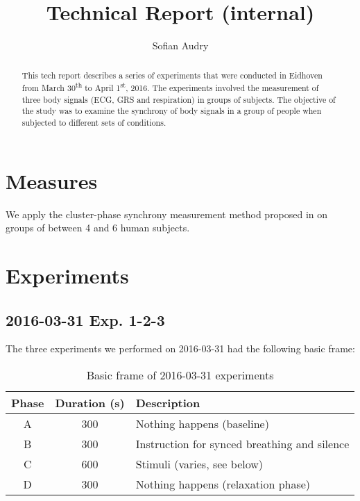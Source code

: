 \documentclass[a4paper,10pt]{article}
\title{Technical Report (internal)}
\author{Sofian Audry}
\begin{document}
\maketitle

\begin{abstract}
This tech report describes a series of experiments that were conducted in Eidhoven from March 30\textsuperscript{th} to April 1\textsuperscript{st}, 2016. The experiments involved the measurement of three body signals (ECG, GRS and respiration) in groups of subjects. The objective of the study was to examine the synchrony of body signals in a group of people when subjected to different sets of conditions.
\end{abstract}

\section{Measures}

We apply the cluster-phase synchrony measurement method proposed in \citep{Richardson2012-Measuring} on groups of between 4 and 6 human subjects.

\section{Experiments}

\subsection{2016-03-31 Exp. 1-2-3}

The three experiments we performed on 2016-03-31 had the following basic frame:

\begin{table}[h]
\caption{Basic frame of 2016-03-31 experiments}
\begin{tabularx}{\textwidth}{|c|c|X|} \hline
Phase & Duration (s) & Description\\\hline\hline 
A        & 300              & Nothing happens (baseline)\\\hline
B        & 300              & Instruction for synced breathing and silence\\\hline
C        & 600              & Stimuli (varies, see below)\\\hline
D        & 300              & Nothing happens (relaxation phase)\\\hline
\end{tabularx}
\end{table}
\end{document}
